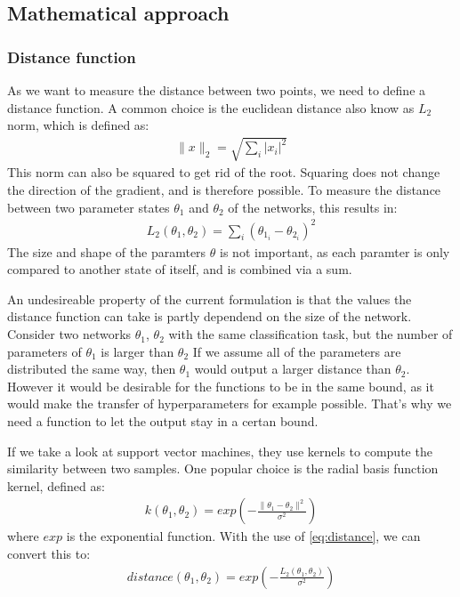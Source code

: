 \subsection{Mathematical approach}\label{sub:Mathematical_approach}
\subsubsection{Distance function}\label{distance_function}
As we want to measure the distance between two points, we need to define a
distance function. A common choice is the euclidean distance also know as $L_2$
norm, which is defined as: 
\begin{align}
    \rVert x \lVert_2 = \sqrt{\sum_i \lvert x_i \rvert^2}
\end{align}
This norm can also be squared to get rid of the root. Squaring does not change
the direction of the gradient, and is therefore possible. To measure the
distance between two parameter states $\theta_1$ and $\theta_2$ of the networks,
this results in:
\begin{align}\label{eq:distance}
    L_2 (\theta_1, \theta_2)= \sum_i (\theta_{1_i}-\theta_{2_i})^2
\end{align}
The size and shape of the paramters $\theta$ is not important, as each paramter
is only compared to another state of itself, and is combined via a sum.

An undesireable property of the current formulation is that the values the
distance function can take is partly dependend on the size of the network.
Consider two networks $\theta_1$, $\theta_2$ with the same classification task,
but the number of parameters of $\theta_1$ is larger than $\theta_2$ If we
assume all of the parameters are distributed the same way, then $\theta_1$ would
output a larger distance than $\theta_2$. However it would be desirable for the
functions to be in the same bound, as it would make the transfer of
hyperparameters for example possible. That's why we need a function to let the
output stay in a certan bound.

If we take a look at support vector machines, they use kernels to compute the
similarity between two samples. One popular choice is the radial basis function
kernel, defined as:
\begin{align}\label{eq:RBF}
    k(\theta_1, \theta_2)=exp(-\frac{\rVert \theta_1 - \theta_2 \lVert^2}{\sigma^2})
\end{align}
where $exp$ is the exponential function. With the use of \ref{eq:distance}, we
can convert this to:
\begin{align}\label{eq:DistanceFinal}
    distance(\theta_1, \theta_2)=exp(-\frac{L_2 (\theta_1, \theta_2)}{\sigma^2})
\end{align}

